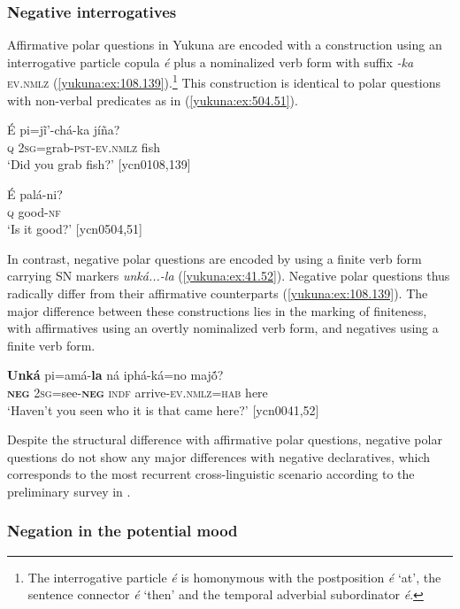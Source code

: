 \documentclass[output=paper,colorlinks,citecolor=brown]{langscibook}
\begin{document}
\subsubsection{Negative interrogatives}\label{yukuna:interrog}

Affirmative polar questions in Yukuna are encoded with a construction using an interrogative particle copula \textit{é} plus a nominalized verb form with suffix \textit{-ka} \textsc{ev.nmlz} (\ref{yukuna:ex:108.139}).\footnote{The interrogative particle \textit{é} is homonymous with the postposition \textit{é} ‘at’, the sentence connector \textit{é} `then' and the temporal adverbial subordinator \textit{é}.} This construction is identical to polar questions with non-verbal predicates as in (\ref{yukuna:ex:504.51}). 

\ea\label{yukuna:ex:108.139}
\gll   É pi=jĩ'-chá-ka jíña? \\
\textsc{q} \textsc{2sg}=grab-\textsc{pst}-\textsc{ev.nmlz} fish \\
\glt ‘Did you grab fish?’ [ycn0108,139]
\z

\ea\label{yukuna:ex:504.51}
\gll   É palá-ni? \\
\textsc{q} good-\textsc{nf}\\
\glt ‘Is it good?’ [ycn0504,51]
\z

In contrast, negative polar questions are encoded by using a finite verb form carrying SN markers \textit{unká...-la} (\ref{yukuna:ex:41.52}). Negative polar questions thus radically differ from their affirmative counterparts (\ref{yukuna:ex:108.139}). The major difference between these constructions lies in the marking of finiteness, with affirmatives using an overtly nominalized verb form, and negatives using a finite verb form. 

\ea\label{yukuna:ex:41.52}
\gll  \textbf{Unká} pi=amá-\textbf{la} ná iphá-ká=no majṍ? \\
\textbf{\textsc{neg}} \textsc{2sg}=see-\textbf{\textsc{neg}} \textsc{indf} arrive-\textsc{ev.nmlz}=\textsc{hab} here \\
\glt ‘Haven't you seen who it is that came here?’ [ycn0041,52]
\z

Despite the structural difference with affirmative polar questions, negative polar questions do not show any major differences with negative declaratives, which corresponds to the most recurrent cross-linguistic scenario according to the preliminary survey in \citet{Miestamo2009neg.interr}.

\subsubsection{Negation in the potential mood}\label{yukuna:pot}
\end{document}

